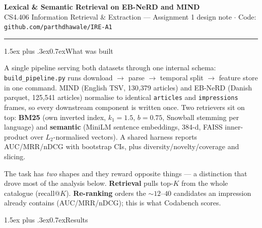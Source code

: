 \documentclass[10pt,a4paper]{article}
\makeatletter
\renewcommand\section{\@startsection{section}{1}{0pt}%
  {1.5ex plus .3ex}{0.7ex}{\normalsize\bfseries\color{accent}}}
\makeatother
\begin{document}
{\LARGE\bfseries Lexical \& Semantic Retrieval on EB-NeRD and MIND}\\[3pt]
{\small CS4.406 Information Retrieval \& Extraction --- Assignment 1 design note \quad$\cdot$\quad
Code: \texttt{github.com/parthdhawale/IRE-A1}}
\vspace{1.5ex}\hrule\vspace{1.5ex}

\section{What was built}

A single pipeline serving both datasets through one internal schema:
\texttt{build\_pipeline.py} runs download $\rightarrow$ parse $\rightarrow$ temporal split
$\rightarrow$ feature store in one command. MIND (English TSV, 130{,}379 articles) and
EB-NeRD (Danish parquet, 125{,}541 articles) normalise to identical \texttt{articles} and
\texttt{impressions} frames, so every downstream component is written once. Two retrievers
sit on top: \textbf{BM25} (own inverted index, $k_1{=}1.5$, $b{=}0.75$, Snowball stemming
per language) and \textbf{semantic} (MiniLM sentence embeddings, 384-d, FAISS
inner-product over $L_2$-normalised vectors). A shared harness reports AUC/MRR/nDCG with
bootstrap CIs, plus diversity/novelty/coverage and slicing.

The task has \emph{two} shapes and they reward opposite things --- a distinction that drove
most of the analysis below. \textbf{Retrieval} pulls top-$K$ from the whole catalogue
(recall@$K$). \textbf{Re-ranking} orders the ${\sim}12$--$40$ candidates an impression
already contains (AUC/MRR/nDCG); this is what Codabench scores.

\section{Results}
\end{document}
